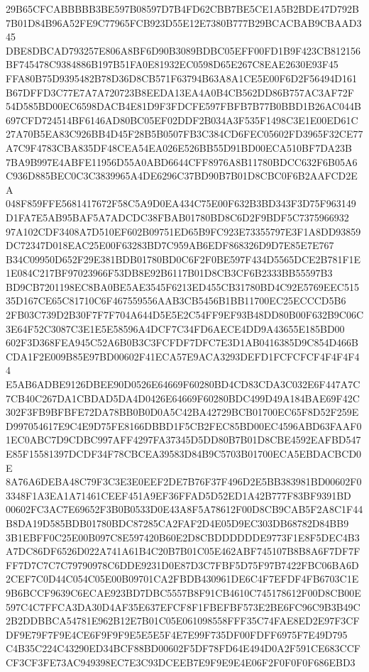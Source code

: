 \documentclass[UTF8,fontset=fandol,zihao=-4,a4paper]{ctexart}
\begin{document}
{{29B65CFCABBBBB3BE597B08597D7B4FD62CBB7BE5CE1A5B2BDE47D792B7B01D84B96A52FE9C77965FCB923D55E12E7380B777B29BCACBAB9CBAAD345
DBE8DBCAD793257E806A8BF6D90B3089BDBC05EFF00FD1B9F423CB812156BF745478C9384886B197B51FA0E81932EC0598D65E267C8EAE2630E93F45
FFA80B75D9395482B78D36D8CB571F63794B63A8A1CE5E00F6D2F56494D161B67DFFD3C77E7A7A720723B8EEDA13EA4A0B4CB562DD86B757AC3AF72F
54D585BD00EC6598DACB4E81D9F3FDCFE597FBFB7B77B0BBD1B26AC044B697CFD724514BF6146AD80BC05EF02DDF2B034A3F535F1498C3E1E00ED61C
27A70B5EA83C926BB4D45F28B5B0507FB3C384CD6FEC05602FD3965F32CE77A7C9F4783CBA835DF48CEA54EA026E526BB55D91BD00ECA510BF7DA23B
7BA9B997E4ABFE11956D55A0ABD6644CFF8976A8B11780BDCC632F6B05A6C936D885BEC0C3C3839965A4DE6296C37BD90B7B01D8CBC0F6B2AAFCD2EA
048F859FFE5681417672F58C5A9D0EA434C75E00F632B3BD343F3D75F963149D1FA7E5AB95BAF5A7ADCDC38FBAB01780BD8C6D2F9BDF5C7375966932
97A102CDF3408A7D510EF602B09751ED65B9FC923E73355797E3F1A8DD93859DC72347D018EAC25E00F63283BD7C959AB6EDF868326D9D7E85E7E767
B34C09950D652F29E381BDB01780BD0C6F2F0BE597F434D5565DCE2B781F1E1E084C217BF97023966F53DB8E92B6117B01D8CB3CF6B2333BB55597B3
BD9CB7201198EC8BA0BE5AE3545F6213ED455CB31780BD4C92E5769EEC51535D167CE65C81710C6F467559556AAB3CB5456B1BB11700EC25ECCCD5B6
2FB03C739D2B30F7F7F704A644D5E5E2C54FF9EF93B48DD80B00F632B9C06C3E64F52C3087C3E1E5E58596A4DCF7C34FD6AECE4DD9A43655E185BD00
602F3D368FEA945C52A6B0B3C3FCFDF7DFC7E3D1AB0416385D9C854D466BCDA1F2E009B85E97BD00602F41ECA57E9ACA3293DEFD1FCFCFCF4F4F4F44
E5AB6ADBE9126DBEE90D0526E64669F60280BD4CD83CDA3C032E6F447A7C7CB40C267DA1CBDAD5DA4D0426E64669F60280BDC499D49A184BAE69F42C
302F3FB9BFBFE72DA78BB0B0D0A5C42BA42729BCB01700EC65F8D52F259ED997054617E9C4E9D75FE8166DBBD1F5CB2FEC85BD00EC4596ABD63FAAF0
1EC0ABC7D9CDBC997AFF4297FA37345D5DD80B7B01D8CBE4592EAFBD547E85F15581397DCDF34F78CBCEA39583D84B9C5703B01700ECA5EBDACBCD0E
8A76A6DEBA48C79F3C3E3E0EEF2DE7B76F37F496D2E5BB383981BD00602F03348F1A3EA1A71461CEEF451A9EF36FFAD5D52ED1A42B777F83BF9391BD
00602FC3AC7E69652F3B0B0533D0E43A8F5A78612F00D8CB9CAB5F2A8C1F44B8DA19D585BDB01780BDC87285CA2FAF2D4E05D9EC303DB68782D84BB9
3B1EBFF0C25E00B097C8E597420B60E2D8CBDDDDDDE9773F1E8F5DEC4B3A7DC86DF6526D022A741A61B4C20B7B01C05E462ABF745107B8B8A6F7DF7F
FF7D7C7C7C79790978C6DDE9231D0E87D3C7FBF5D75F97B7422FBC06BA6D2CEF7C0D44C054C05E00B09701CA2FBDB430961DE6C4F7EFDF4FB6703C1E
9B6BCCF9639C6ECAE923BD7DBC5557B8F91CB4610C745178612F00D8CB00E597C4C7FFCA3DA30D4AF35E637EFCF8F1FBEFBF573E2BE6FC96C9B3B49C
2B2DDBBCA54781E962B12E7B01C05E061098558FFF35C74FAE8ED2E97F3CFDF9E79F7F9E4CE6F9F9F9E5E5E5F4E7E99F735DF00FDFF6975F7E49D795
C4B35C224C43290ED34BCF88BD00602F5DF78FD64E494D0A2F591CE683CCFCF3CF3FE73AC949398EC7E3C93DCEEB7E9F9E9E4E06F2F0F0F0F686EBD3
}}
\end{document}
